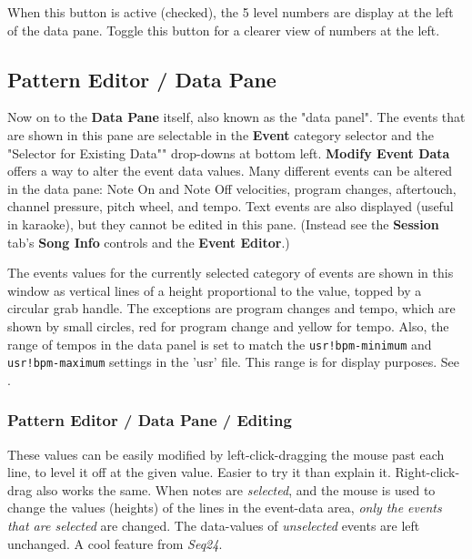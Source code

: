    When this button is active (checked), the 5 level numbers
   are display at the left of the data pane.
   Toggle this button for a clearer view of numbers at the left.

\subsection{Pattern Editor / Data Pane}
\label{subsec:pattern_editor_data_view}

   Now on to the \textbf{Data Pane} itself, also known as the "data panel".
   The events that are shown in this pane
   are selectable in the \textbf{Event} category
   selector and the "Selector for Existing Data"" drop-downs at bottom left.
   \textbf{Modify Event Data} offers a way to
   alter the event data values.
   Many different events can be altered in the data pane:
   Note On and Note Off velocities, program changes, aftertouch, channel
   pressure, pitch wheel, and tempo.
   Text events are also displayed (useful in karaoke), but they cannot be
   edited in this pane.
   (Instead see the \textbf{Session} tab's \textbf{Song Info} controls and
   the \textbf{Event Editor}.)

   The events values for the currently selected category of events are shown
   in this window as vertical lines of a height proportional to the value,
   topped by a circular grab handle.
   The exceptions are program changes and tempo, which are shown by small
   circles, red for program change and yellow for tempo.
   Also, the range of tempos in the data panel is set to match the
   \texttt{usr!bpm-minimum}
   and
   \texttt{usr!bpm-maximum}
   settings in the 'usr' file.
   This range is for display purposes.
   See .

\subsubsection{Pattern Editor / Data Pane / Editing}
\label{subsubsec:pattern_editor_data_view_editing}

   These values can be easily modified by
   left-click-dragging the
   mouse past each line, to level it off at the given value.
   Easier to try it than explain it.
   Right-click-drag also works the same.
   When notes are \textsl{selected}, and the
   mouse is used to change the values (heights) of the lines in the event-data
   area, \textsl{only the events that are selected} are changed.
   The data-values of \textsl{unselected} events are left unchanged.
   A cool feature from \textsl{Seq24}.

